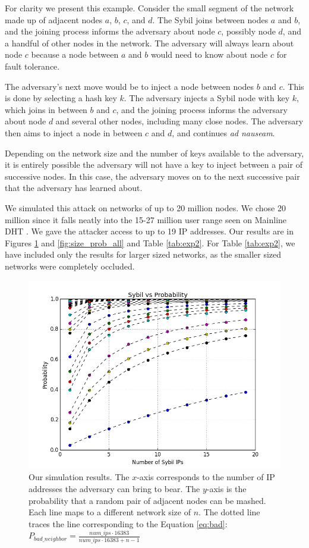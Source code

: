 \documentclass[11pt,conference]{IEEEtran}
\begin{document}
For clarity we present this example. 
Consider the small segment of the network made up of adjacent nodes $a$, $b$, $c$, and $d$.
The Sybil joins between nodes $a$ and $b$, and the joining process informs the adversary about node $c$, possibly node $d$, and a handful of other nodes in the network.
The adversary will always learn about node $c$ because a node between $a$ and $b$ would need to know about node $c$ for fault tolerance.

The adversary's next move would be to inject a node between nodes $b$ and $c$.
This is done by selecting a hash key $k$.
The adversary injects a Sybil node with key $k$, which joins in between $b$ and $c$, and the joining process informs the adversary about node $d$ and several other nodes, including many close nodes.
The adversary then aims to inject a node in between $c$ and $d$, and continues \textit{ad nauseam}.  %

Depending on the network size and the number of keys available to the adversary, it is entirely possible the adversary will not have a key to inject between a pair of successive nodes.
In this case, the adversary moves on to the next successive pair that the adversary has learned about.

We simulated this attack on networks of up to 20 million nodes.
We chose 20 million since it falls neatly into the 15-27 million user range seen on Mainline DHT \cite{mainlineMeasure}.
We gave the attacker access to up to 19 IP addresses.
Our results are in Figures \ref{fig:exp2} and \ref{fig:size_prob_all} and Table \ref{tab:exp2}.
For Table \ref{tab:exp2}, we have included only the results for larger sized networks, as the smaller sized networks were completely occluded.


\begin{figure}
\centering
\includegraphics[width=1\linewidth]{ip_prob_all}
\caption[foo]{Our simulation results.  
    The $x$-axis corresponds to the number of IP addresses the adversary can bring to bear.
    The $y$-axis is the probability that a random pair of adjacent nodes can be mashed.
    Each line maps to a different network size of $n$.
    The dotted line traces the line corresponding to the Equation \ref{eq:bad}: $ P_{bad\_neighbor} =  \frac{num\_ips \cdot 16383}{num\_ips \cdot 16383 + n - 1}$}
\label{fig:exp2}
\end{figure}
\end{document}

